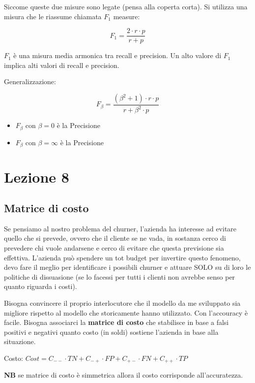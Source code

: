Siccome queste due misure sono legate (pensa alla coperta corta). Si utilizza una misura che le riassume chiamata $F_1$ measure:

\[ F_1 = \frac{2 \cdot r \cdot p}{r + p}\]

$F_1$ \`e una misura media armonica tra recall e precision. Un alto valore di $F_1$ implica alti valori di recall e precision.

Generalizzazione:

\[ F_\beta = \frac{(\beta^2 + 1) \cdot r \cdot p}{r + \beta^2 \cdot p} \]

\begin{itemize}
	\item $F_\beta$ con $\beta = 0$ \`e la Precisione
	\item $F_\beta$ con $\beta = \infty$ \`e la Precisione	
\end{itemize}

\section{Lezione 8}

\subsection{Matrice di costo}
Se pensiamo al nostro problema del churner, l'azienda ha interesse ad evitare quello che si prevede, ovvero che il cliente se ne vada, in sostanza cerco di prevedere chi vuole andarsene e cerco di evitare che questa previsione sia effettiva. L'azienda pu\`o spendere un tot budget per invertire questo fenomeno, devo fare il meglio per identificare i possibili churner e attuare SOLO su di loro le politiche di dissuasione (se lo facessi per tutti i clienti non avrebbe senso per quanto riguarda i costi).

Bisogna convincere il proprio interlocutore che il modello da me sviluppato sia migliore rispetto al modello che storicamente hanno utilizzato. Con l'accouracy \`e facile. Bisogna associarci la \textbf{matrice di costo} che stabilisce in base a falsi positivi e negativi quanto costo (in soldi) sostiene l'azienda in base alla situazione. 

Costo: $Cost = C_{--} \cdot TN + C_{-+} \cdot FP + C_{+-} \cdot FN + C_{++} \cdot TP$

\textbf{NB} se matrice di costo \`e simmetrica allora il costo corrisponde all'accuratezza.

